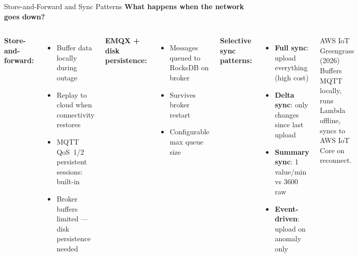 \documentclass[aspectratio=169,11pt]{beamer}
\begin{document}
\begin{frame}{Store-and-Forward and Sync Patterns}
    \small
    \textbf{What happens when the network goes down?}

    \vspace{0.05cm}
    \begin{columns}
        \textbf{Store-and-forward:}
        \begin{itemize}\setlength{\itemsep}{0pt}
            \item Buffer data locally during outage
            \item Replay to cloud when connectivity restores
            \item MQTT QoS~1/2 persistent sessions: built-in
            \item Broker buffers limited --- disk persistence needed
        \end{itemize}

        \vspace{0.05cm}
        \textbf{EMQX + disk persistence:}
        \begin{itemize}\setlength{\itemsep}{0pt}
            \item Messages queued to RocksDB on broker
            \item Survives broker restart
            \item Configurable max queue size
        \end{itemize}

        \textbf{Selective sync patterns:}
        \begin{itemize}\setlength{\itemsep}{0pt}
            \item \textbf{Full sync}: upload everything (high cost)
            \item \textbf{Delta sync}: only changes since last upload
            \item \textbf{Summary sync}: 1 value/min vs 3600 raw
            \item \textbf{Event-driven}: upload on anomaly only
        \end{itemize}

        \vspace{0.05cm}
        \begin{exampleblock}{AWS IoT Greengrass (2026)}
            Buffers MQTT locally, runs Lambda offline, syncs to AWS IoT Core on reconnect.
        \end{exampleblock}
    \end{columns}
\end{frame}
\end{document}
